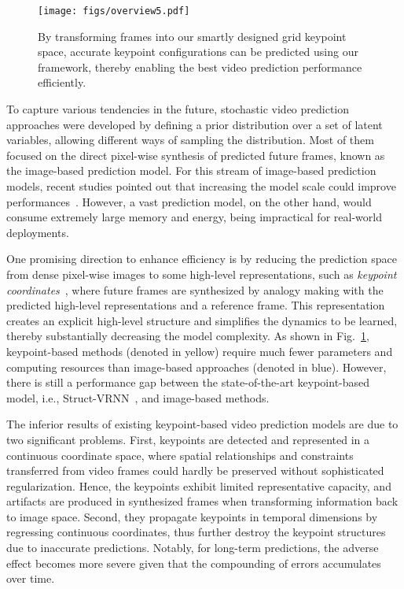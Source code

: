 \documentclass[letterpaper, 10 pt, conference]{ieeeconf}
\begin{document}
\begin{figure}[t]
	\texttt{[image: figs/overview5.pdf]}
	\centering
	\caption{By transforming frames into our smartly designed grid keypoint space, accurate keypoint configurations can be predicted using our framework, thereby enabling the best video prediction performance efficiently.
	}
	\label{fig:overview}
	\vspace{-4mm}
\end{figure}






To capture various tendencies in the future, stochastic video prediction approaches were developed by defining a prior distribution over a set of latent variables, allowing different ways of sampling the distribution.
Most of them focused on the direct pixel-wise synthesis of predicted future frames, known as the image-based prediction model.
For this stream of image-based prediction models, recent studies pointed out that increasing the model scale could improve performances~\cite{castrejon2019improved,villegas2019high}.
However, a vast prediction model, on the other hand, would consume extremely large memory and energy, being impractical for real-world deployments.

One promising direction to enhance efficiency is by reducing the prediction space from dense pixel-wise images to some high-level representations, such as {\em keypoint coordinates\/}~\cite{jakab2018unsupervised,zhang2018unsupervised}, where future frames are synthesized by analogy making with the predicted high-level representations and a reference frame.
This representation creates an explicit high-level structure and simplifies the dynamics to be learned, thereby substantially decreasing the model complexity. 
As shown in Fig.~\ref{fig:overview}, keypoint-based methods (denoted in yellow) require much fewer parameters and computing resources than image-based approaches (denoted in blue).
However, there is still a performance gap between the state-of-the-art keypoint-based model, i.e., Struct-VRNN~\cite{minderer2019unsupervised}, and image-based methods.




The inferior results of existing keypoint-based video prediction models are due to two significant problems.
First, keypoints are detected and represented in a continuous coordinate space,
where spatial relationships and constraints transferred from video frames could hardly be preserved without sophisticated regularization. 
Hence, the keypoints exhibit limited representative capacity, and artifacts are produced in synthesized frames when transforming information back to image space.
Second, they propagate keypoints in temporal dimensions by regressing continuous coordinates, thus further destroy the keypoint structures due to inaccurate predictions.
Notably, for long-term predictions, the adverse effect becomes more severe given that the compounding of errors accumulates over time.
\end{document}
